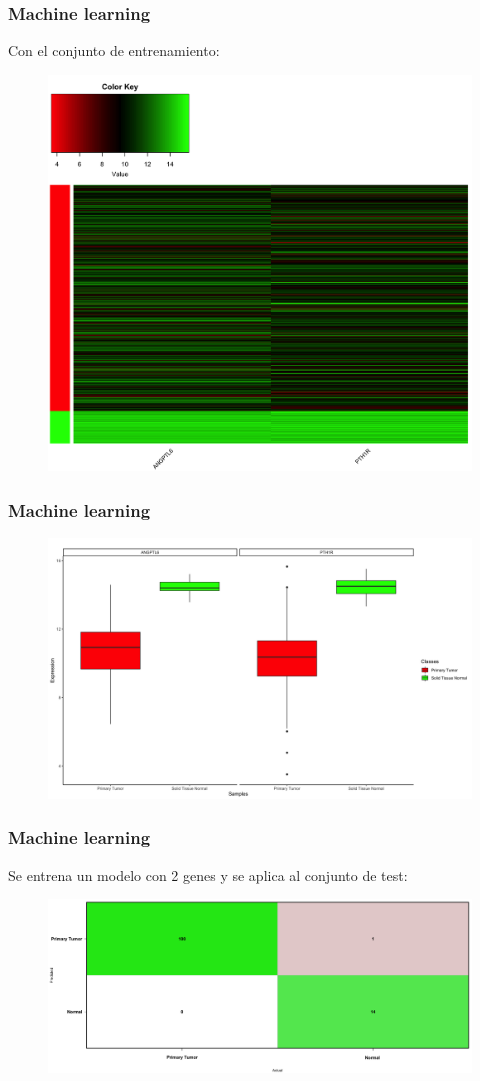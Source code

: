 \documentclass{beamer}
\begin{document}
\begin{frame}\frametitle{Machine learning}
	Con el conjunto de entrenamiento:
	\begin{figure}
		\centering
		\includegraphics[width=.6\textwidth]{images/15_higado_biclase_42_knn_heatmap_mejor_metodo.png}
	\end{figure}
\end{frame}

\begin{frame}\frametitle{Machine learning}
	\begin{figure}
		\centering
		\includegraphics[width=.9\textwidth]{images/16_higado_biclase_43_knn_boxplots_mejor_metodo.png}
	\end{figure}
\end{frame}


\begin{frame}\frametitle{Machine learning}
	Se entrena un modelo con 2 genes y se aplica al conjunto de test:
	\begin{figure}
		\centering
		\includegraphics[width=.9\textwidth]{images/17_higado_biclase_18_svm_matriz_confusion_mejor_metodo.png}
	\end{figure}
\end{frame}
\end{document}
